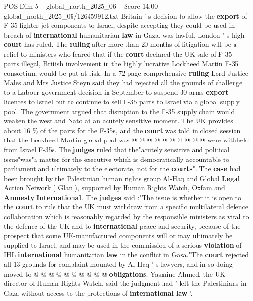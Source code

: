 \begin{textsample}{POS Dim 5 – global\_north\_2025\_06 – Score 14.00 – global\_north\_2025\_06/126459912.txt}  \label{ex:f5_pos_086}
Britain ' s decision to allow the \textbf{export} of F-35 fighter jet components to Israel, despite accepting they could be used in breach of \textbf{international} humanitarian \textbf{law} in Gaza, was lawful, London ' s high \textbf{court} has ruled.
The \textbf{ruling} after more than 20 months of litigation will be a relief to ministers who feared that if the \textbf{court} declared the UK sale of F-35 parts illegal, British involvement in the highly lucrative Lockheed Martin F-35 consortium would be put at risk.
In a 72-page comprehensive \textbf{ruling} Lord Justice Males and Mrs Justice Steyn said they had rejected all the grounds of challenge to a Labour government decision in September to suspend 30 arms \textbf{export} licences to Israel but to continue to sell F-35 parts to Israel via a global supply pool.
The government argued that disruption to the F-35 supply chain would weaken the west and Nato at an acutely sensitive moment.
The UK provides about 16 \% of the parts for the F-35s, and the \textbf{court} was told in closed session that the Lockheed Martin global pool was @ @ @ @ @ @ @ @ @ @ were withheld from Israel F-35s.
The \textbf{judges} ruled that the"acutely sensitive and political issue"was"a matter for the executive which is democratically accountable to parliament and ultimately to the electorate, not for the \textbf{courts}".
The \textbf{case} had been brought by the Palestinian human rights group Al-Haq and Global \textbf{Legal} Action Network ( Glan ), supported by Human Rights Watch, Oxfam and \textbf{Amnesty} \textbf{International}.
The \textbf{judges} said :"The issue is whether it is open to the \textbf{court} to rule that the UK must withdraw from a specific multilateral defence collaboration which is reasonably regarded by the responsible ministers as vital to the defence of the UK and to \textbf{international} peace and security, because of the prospect that some UK-manufactured components will or may ultimately be supplied to Israel, and may be used in the commission of a serious \textbf{violation} of IHL \textbf{international} humanitarian \textbf{law} in the conflict in Gaza."The \textbf{court} rejected all 13 grounds for complaint mounted by Al-Haq ' s lawyers, and in so doing moved to @ @ @ @ @ @ @ @ @ @ \textbf{obligations}.
Yasmine Ahmed, the UK director of Human Rights Watch, said the judgment had ' left the Palestinians in Gaza without access to the protections of \textbf{international} \textbf{law} '.

\end{textsample}
